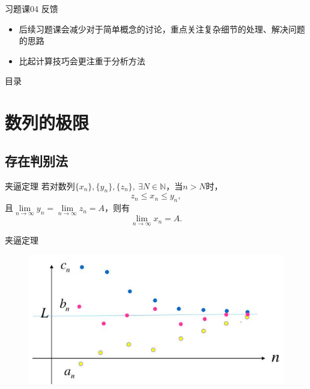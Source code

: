 \documentclass[]{beamer}
\begin{document}
\begin{frame}{习题课04 反馈}
    \begin{itemize}
        \item 后续习题课会减少对于简单概念的讨论，重点关注复杂细节的处理、解决问题的思路
        \item 比起计算技巧会更注重于分析方法
    \end{itemize}
\end{frame}


\begin{frame}{目录}
    \tableofcontents
\end{frame}



\section{数列的极限}

\subsection{存在判别法}

\begin{frame}{夹逼定理}
    若对数列$\{x_n\},\{y_n\},\{z_n\},\ \exists N\in\mathbb{N}$，当$n>N$时，
    \[
    z_n\le x_n\le y_n,
    \]
    且$\lim\limits_{n\rightarrow\infty}y_n=\lim\limits_{n\rightarrow\infty}z_n=A$，则有
    \[
    \lim\limits_{n\rightarrow\infty}x_n = A.
    \]
\end{frame}

\begin{frame}{夹逼定理}
    \begin{figure}[H]
        \centering
        \includegraphics[width=0.7\linewidth]{squeeze.png}
    \end{figure}
\end{frame}
\end{document}
